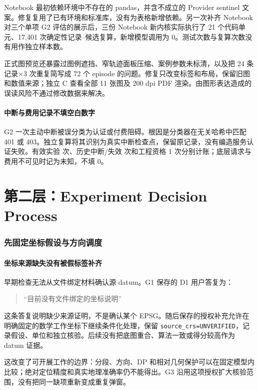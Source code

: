 \documentclass[11pt,a4paper]{article}
\begin{document}
Notebook 最初依赖环境中不存在的 pandas，并含不成立的 Provider sentinel 文案。修复复用了已有环境和标准库，没有为表格新增依赖。另一次补齐 Notebook 对三个单项 G2 评估的展示后，三份 Notebook 新内核实际执行了 21 个代码单元、17,401 次确定性记录--候选复算，新增模型调用为 0。测试次数与复算次数没有用作独立样本数。

正式图预览还暴露过图例遮挡、窄轨迹面板压缩、案例参数未标清，以及把 24 条记录$\times$3 次重复简写成 72 个 episode 的问题。修复只改变标签和布局，保留旧图和数值来源；独立 C 查看全部 11 张图及 200 dpi PDF 渲染。由图形表达造成的误读风险不通过修改数据来解决。

\subsection{中断与费用记录不填空白数字}
G2 一次主动中断被误分类为认证或付费阻碍。根因是分类器在无关哈希中匹配 401 或 403。独立复算将其识别为真实中断检查点，保留原记录，没有编造服务认证失败。有效实验 \ValidModelCalls{} 次、历史中断/失效 \HistoricModelCalls{} 次和工程资格 1 次分别计账；底层请求与费用不可见时记为未知，不填 0。



\clearpage
\part*{第二层：Experiment Decision Process}

\section{先固定坐标假设与方向调度}\label{sec:technical-authorization}
\subsection{坐标来源缺失没有被假标签补齐}
早期检查无法从文件绑定材料确认源 datum。G1 保存的 D1 用户答复为：
\begin{quote}“目前没有文件绑定的坐标说明”\end{quote}
这条答复说明缺少来源证明，不是确认某个 EPSG。随后保存的授权补充允许在明确固定的数学工作坐标下继续条件化处理，保留 \texttt{source\_crs=UNVERIFIED}，记录假设、单位和独立核验。后续没有把底图重合、算法一致或得分较高作为 datum 证据。

这改变了可开展工作的边界：分段、方向、DP 和相对几何保护可以在固定模型内比较；绝对定位精度和真实地理准确率仍不能得出。G3 沿用这项授权扩大核验范围，没有把同一缺项重新变成重复弹窗。
\end{document}

